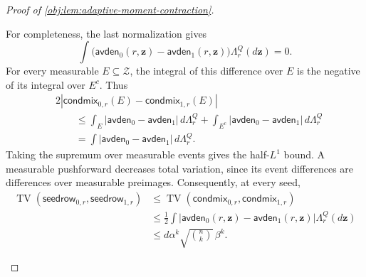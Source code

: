 \documentclass[11pt]{article}
\begin{document}
\begin{proof}[Proof of \cref{obj:lem:adaptive-moment-contraction}]
\begin{enumerate}
For completeness, the last normalization gives
\[
\int\bigl(\mathsf{avden}_0(r,\mathbf z)
          -\mathsf{avden}_1(r,\mathbf z)\bigr)
 \Lambda_r^Q(d\mathbf z)=0.
\]
For every measurable \(E\subseteq\mathcal Z\), the integral of this difference over \(E\) is the negative of its integral over \(E^c\). Thus
\[
\begin{split}
&2\left|
 \mathsf{condmix}_{0,r}(E)-\mathsf{condmix}_{1,r}(E)
 \right|\\
&\qquad\le
 \int_E|\mathsf{avden}_0-\mathsf{avden}_1|\,d\Lambda_r^Q
 +\int_{E^c}|\mathsf{avden}_0-\mathsf{avden}_1|\,d\Lambda_r^Q\\
&\qquad=
 \int|\mathsf{avden}_0-\mathsf{avden}_1|\,d\Lambda_r^Q.
\end{split}
\]
Taking the supremum over measurable events gives the half-\(L^1\) bound. A measurable pushforward decreases total variation, since its event differences are differences over measurable preimages. Consequently, at every seed,
\[
\begin{split}
\operatorname{TV}(\mathsf{seedrow}_{0,r},\mathsf{seedrow}_{1,r})
&\le
\operatorname{TV}(\mathsf{condmix}_{0,r},\mathsf{condmix}_{1,r})\\
&\le
\frac12\int
 |\mathsf{avden}_0(r,\mathbf z)-\mathsf{avden}_1(r,\mathbf z)|
 \Lambda_r^Q(d\mathbf z)\\
&\le d\alpha^k\sqrt{\binom nk}\,\beta^k.
\end{split}
\]


\end{enumerate}
\end{proof}
\end{document}

